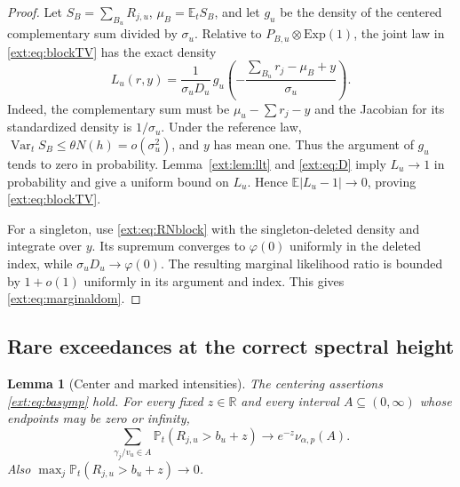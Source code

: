 \documentclass[11pt]{article}
\newtheorem{lemma}[theorem]{Lemma}
\theoremstyle{definition}
\theoremstyle{remark}
\begin{document}
\begin{proof}
Let $S_B=\sum_{B_u}R_{j,u}$, $\mu_B=\mathbb E_tS_B$, and let $g_u$ be
the density of the centered complementary sum divided by $\sigma_u$.
Relative to $P_{B,u}\otimes\mathrm{Exp}(1)$, the joint law in
\eqref{ext:eq:blockTV} has the exact density
\begin{equation}\label{ext:eq:RNblock}
 L_u(r,y)=\frac1{\sigma_uD_u}\,
   g_u\!\left(-\frac{\sum_{B_u}r_j-\mu_B+y}{\sigma_u}\right).
\end{equation}
Indeed, the complementary sum must be $\mu_u-\sum r_j-y$ and the
Jacobian for its standardized density is $1/\sigma_u$.
Under the reference law,
$\operatorname{Var}_tS_B\le\theta N(h)=o(\sigma_u^2)$, and $y$ has
mean one.  Thus the argument of $g_u$ tends to zero in probability.
Lemma~\ref{ext:lem:llt} and \eqref{ext:eq:D} imply $L_u\to1$ in
probability and give a uniform bound on $L_u$.  Hence
$\mathbb E|L_u-1|\to0$, proving \eqref{ext:eq:blockTV}.

For a singleton, use \eqref{ext:eq:RNblock} with the singleton-deleted
density and integrate over $y$.  Its supremum converges to $\varphi(0)$
uniformly in the deleted index, while $\sigma_uD_u\to\varphi(0)$.
The resulting marginal likelihood ratio is bounded by $1+o(1)$
uniformly in its argument and index.  This gives
\eqref{ext:eq:marginaldom}.
\end{proof}

\subsection{Rare exceedances at the correct spectral height}

\begin{lemma}[Center and marked intensities]\label{ext:lem:intensity}
The centering assertions \eqref{ext:eq:basymp} hold.  For every fixed
$z\in\mathbb R$ and every interval $A\subseteq(0,\infty)$ whose
endpoints may be zero or infinity,
\begin{equation}\label{ext:eq:markedtail}
 \sum_{\gamma_j/v_u\in A}
   \mathbb P_t(R_{j,u}>b_u+z)
 \longrightarrow e^{-z}\nu_{\alpha,p}(A).
\end{equation}
Also $\max_j\mathbb P_t(R_{j,u}>b_u+z)\to0$.
\end{lemma}
\end{document}
